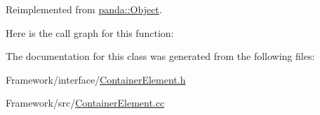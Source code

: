 Reimplemented from \hyperlink{classpanda_1_1Object_a7bba3813f78065be847cd8d85bab93fc}{panda\-::\-Object}.



Here is the call graph for this function\-:




The documentation for this class was generated from the following files\-:\begin{DoxyCompactItemize}
\item 
Framework/interface/\hyperlink{ContainerElement_8h}{Container\-Element.\-h}\item 
Framework/src/\hyperlink{ContainerElement_8cc}{Container\-Element.\-cc}\end{DoxyCompactItemize}
